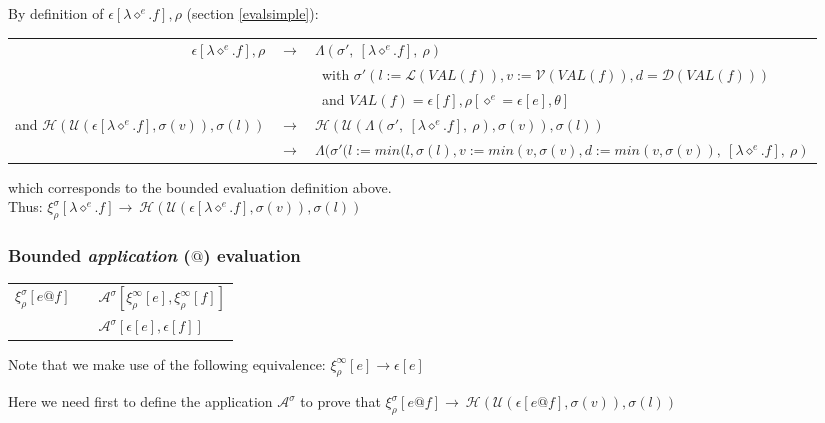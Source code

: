 \documentclass[10pt,a4paper,frenchb]{article}
\makeatletter
\newcommand{\var}[1]	{\ensuremath{\diamond^#1}}
\newcommand{\closure}	{\ensuremath{\Lambda}}
\newcommand{\applyop}	{\ensuremath{@}}
\newcommand{\evalsym}			{\ensuremath{\epsilon}}
\newcommand{\boundevalsym}	{\ensuremath{\xi}}
\newcommand{\envsym}			{\ensuremath{\rho}}
\newcommand{\emptyenv}		{\ensuremath{\theta}}
\newcommand{\applysym}		{\ensuremath{\mathcal A}}
\newcommand{\boundapplysym}[1]	{\ensuremath{\applysym^{#1}}}
\newcommand{\closenv}[2][f]		{\closure(#2,\ [\lambda \var{e}.#1],\ \envsym)}
\newcommand{\eval}[1]					{\boundevalsym_\envsym^{#1}}
\newcommand{\evalexpr}[2][\bounds]	{\eval{#1}\left[#2\right]}
\newcommand{\evalsimpleshort}[1]		{\evalsym\left[#1\right]}
\newcommand{\evalsimple}[1]			{\evalsym\left[#1\right],\rho}
\newcommand{\apply}[3][\bounds]		{\boundapplysym{#1}\left[#2,#3\right]}
\newcommand{\result}[2]				{#1}
\newcommand{\equivalence}[1]			{\head( \top (#1, \bounds(v)), \bounds(l))}
\newcommand{\opexpr}[1] 	{e #1 f}
\newcommand{\lambdaexpr}	{\lambda \var{e}.f}
\newcommand{\ra}	{\ensuremath{\rightarrow}}
\newcommand{\length}		{\ensuremath{\mathcal L}}
\newcommand{\voices}		{\ensuremath{\mathcal V}}
\newcommand{\dur}			{\ensuremath{\mathcal D}}
\newcommand{\head}			{\ensuremath{\mathcal H}}
\renewcommand{\top}		{\ensuremath{\mathcal U}}
\newcommand{\bounds}		{\ensuremath{\sigma}}
\newcommand{\nobounds}	{\ensuremath{\infty}}
\newcommand{\evaltable}[1][$\rightarrow$]	  {\begin{center} \begin{tabular*}{0.9\linewidth}{rc@{ #1 }l}}
\newcommand{\evaltablend}  		{\end{tabular*}\end{center}}
\makeatother
\begin{document}
By definition of $\evalsimple{\lambdaexpr}$  (section \ref{evalsimple}):
\evaltable[]
 $\evalsimple{\lambdaexpr}$ 	& \ra & $\closenv{\bounds'}$ \\
 								& & \ with $\bounds'(l:=\length(VAL(f)), v:=\voices(VAL(f)), d=\dur(VAL(f)))$ \\
			 			& & \ and $VAL(f) = \evalsimpleshort{f},\envsym[\var{e}= \evalsimpleshort{e}, \emptyenv]$ \\
and $\head( \top (\evalsimpleshort{\lambdaexpr}, \bounds(v)), \bounds(l))$ &  \ra & $\head( \top (\closenv{\bounds'}, \bounds(v)), \bounds(l))$ \\
			&  \ra & $\closenv{\bounds'(l:=min(l,\bounds(l), v:=min(v, \bounds(v), d:=min(v,\bounds(v))} $
\evaltablend

which corresponds to the bounded evaluation definition above. \\
Thus: \hspace{1cm} $\evalexpr{\lambdaexpr} \rightarrow \ \equivalence{\evalsimpleshort{\lambdaexpr}}$


\subsubsection{Bounded \emph{application} ($\applyop$) evaluation}
\evaltable
 $\evalexpr{\opexpr{\applyop}}$ 	
 		&  & $\result{\apply{\evalexpr[\nobounds]{e}}{\evalexpr[\nobounds]{f}}}{\bounds(l:=l-l_f, v:=v-v_f)}$\\
 		&  & $\apply{\evalsimpleshort{e}}{\evalsimpleshort{f}}$\\
\evaltablend
Note that we make use of the following equivalence: \hspace{1cm} $\evalexpr[\nobounds]{e} \rightarrow \evalsimpleshort{e}$

Here we need first to define the application \boundapplysym{\bounds} to prove that \hspace{5mm} $\evalexpr{\opexpr{\applyop}} \rightarrow \: \equivalence{\evalsimpleshort{\opexpr{\applyop}}}$ 

\end{document}
